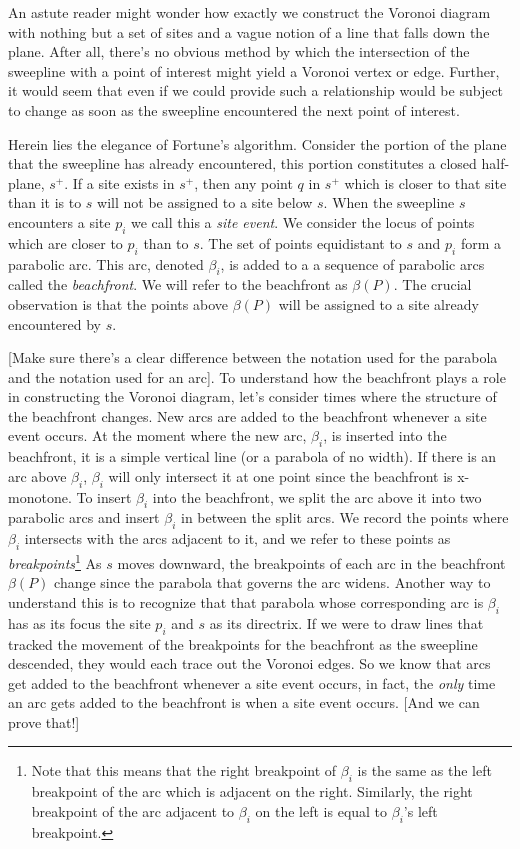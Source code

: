 \documentclass[12pt,twoside]{reedthesis}
\begin{document}
    An astute reader might wonder how exactly we construct the Voronoi diagram with nothing but a set of sites and a vague notion of a line that falls down the plane. After all, there's no obvious method by which the intersection of the sweepline with a point of interest might yield a Voronoi vertex or edge. Further, it would seem that even if we could provide such a relationship would be subject to change as soon as the sweepline encountered the next point of interest. \par
    Herein lies the elegance of Fortune's algorithm. Consider the portion of the plane that the sweepline has already encountered, this portion constitutes a closed half-plane, $s^+$. If a site exists in $s^+$, then any point $q$ in $s^+$ which is closer to that site than it is to $s$ will not be assigned to a site below $s$. When the sweepline $s$ encounters a site $p_{i}$ we call this a \emph{site event}. We consider the locus of points which are closer to $p_{i}$ than to $s$. The set of points equidistant to $s$ and $p_{i}$ form a parabolic arc. This arc, denoted $\beta_{i}$, is added to a a sequence of parabolic arcs called the \emph{beachfront}. We will refer to the beachfront as $\beta(P)$. The crucial observation is that the points above $\beta(P)$ will be assigned to a site already encountered by $s$. \par

    [Make sure there's a clear difference between the notation used for the parabola and the notation used for an arc].
    To understand how the beachfront plays a role in constructing the Voronoi diagram, let's consider times where the structure of the beachfront changes. New arcs are added to the beachfront whenever a site event occurs. At the moment where the new arc, $\beta_{i}$, is inserted into the beachfront, it is a simple vertical line (or a parabola of no width). If there is an arc above $\beta_{i}$, $\beta_{i}$ will only intersect it at one point since the beachfront is x-monotone. To insert $\beta_{i}$ into the beachfront, we split the arc above it into two parabolic arcs and insert $\beta_{i}$ in between the split arcs. We record the points where $\beta_{i}$ intersects with the arcs adjacent to it, and we refer to these points as \emph{breakpoints}\footnote{Note that this means that the right breakpoint of $\beta_{i}$ is the same as the left breakpoint of the arc which is adjacent on the right. Similarly, the right breakpoint of the arc adjacent to $\beta_{i}$ on the left is equal to $\beta_{i}$'s left breakpoint.} As $s$ moves downward, the breakpoints of each arc in the beachfront $\beta(P)$ change since the parabola that governs the arc widens. Another way to understand this is to recognize that that parabola whose corresponding arc is $\beta_{i}$ has as its focus the site $p_{i}$ and $s$ as its directrix. If we were to draw lines that tracked the movement of the breakpoints for the beachfront as the sweepline descended, they would each trace out the Voronoi edges. So we know that arcs get added to the beachfront whenever a site event occurs, in fact, the \emph{only} time an arc gets added to the beachfront is when a site event occurs. [And we can prove that!] \par
\end{document}
